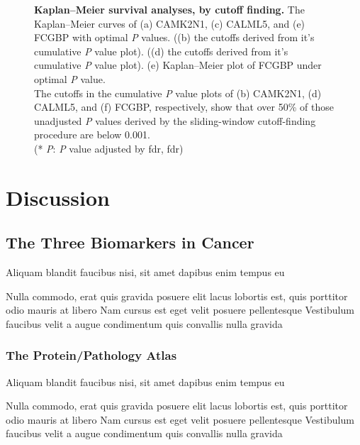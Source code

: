 \documentclass[
paper=landscape,
paper=160mm:90mm, %
fontsize=11pt, %
pagesize, %
parskip=half-, %
]{scrartcl} %
\newcommand{\bcaption}[2]{\caption{\textbf{#1} #2}}
\theoremstyle{mythmstyle} %
\begin{document}
\begin{figure}[hbt!]
\bcaption{Kaplan--Meier survival analyses, by cutoff finding.}
{The Kaplan--Meier curves of (a) CAMK2N1, (c) CALML5, and (e) FCGBP with optimal \protect\textit{P} values. 
((b) the cutoffs derived from it's cumulative \protect\textit{P} value plot).
((d) the cutoffs derived from it's cumulative \protect\textit{P} value plot).
(e) Kaplan--Meier plot of FCGBP under optimal \protect\textit{P} value.\\
The cutoffs in the cumulative \protect\textit{P} value plots of (b) CAMK2N1, (d) CALML5, and (f) FCGBP, respectively,
show that over 50\% of those unadjusted \protect\textit{P} values derived by the sliding-window cutoff-finding procedure are below 0.001.\\
(* \protect\textit{P}: \protect\textit{P} value adjusted by \acrlong{fdr}, \acrshort{fdr})
}
\end{figure}

\clearpage

\section{Discussion}
\subsection{The Three Biomarkers in Cancer}

\begin{outline}

\1 Aliquam blandit faucibus nisi, sit amet dapibus enim tempus eu

\2 Nulla commodo, erat quis gravida posuere
\1 elit lacus lobortis est, quis porttitor odio mauris at libero
\1 Nam cursus est eget velit posuere pellentesque
\1 Vestibulum faucibus velit a augue condimentum quis convallis nulla gravida

\end{outline}


\clearpage

\subsubsection*{The Protein/Pathology Atlas} %

\begin{outline}

\1 Aliquam blandit faucibus nisi, sit amet dapibus enim tempus eu

\2 Nulla commodo, erat quis gravida posuere
\1 elit lacus lobortis est, quis porttitor odio mauris at libero
\1 Nam cursus est eget velit posuere pellentesque
\1 Vestibulum faucibus velit a augue condimentum quis convallis nulla gravida

\end{outline}
\end{document}
